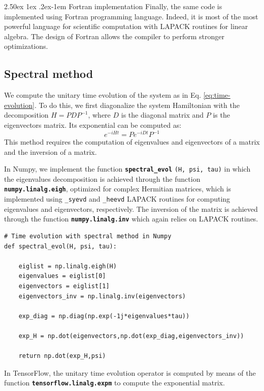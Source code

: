 \documentclass[rmp,10pt,onecolumn,fleqn,notitlepage]{revtex4-1}
\makeatletter
\renewcommand{\paragraph}{%
    \@startsection{paragraph}{4}%
    {\z@}{2.50ex \@plus 1ex \@minus .2ex}{-1em}%
    {\bf\sffamily}%
}
\makeatother
\begin{document}
\paragraph{Fortran implementation}
Finally, the same code is implemented using Fortran programming language. Indeed, it is most of the most powerful language for scientific computation with LAPACK routines for linear algebra. The design of Fortran allows the compiler to perform stronger optimizations. 


\subsection{Spectral method}
\label{subsec:spectral-method}
We compute the unitary time evolution of the system as in Eq. \eqref{eq:time-evolution}. To do this, we first diagonalize the system Hamiltonian with the decomposition $H = PDP^{-1}$, where $D$ is the diagonal matrix and $P$ is the eigenvectors matrix.
Its exponential can be computed as:
\begin{equation}
    e^{-iHt} = P e^{-iDt} P^{-1}
\end{equation}
This method requires the computation of eigenvalues and eigenvectors of a matrix and the inversion of a matrix.

In Numpy, we implement the function {\bfseries\texttt{spectral\_evol}} \texttt{(H, psi, tau)} in which the eigenvalues decomposition is achieved through the function {\bfseries\texttt{numpy.linalg.eigh}}, optimized for complex Hermitian matrices, which is implemented using \texttt{\_syevd} and \texttt{\_heevd} LAPACK routines for computing eigenvalues and eigenvectors, respectively. The inversion of the matrix is achieved through the function {\bfseries\texttt{numpy.linalg.inv}} which again relies on LAPACK routines. 

\begin{lstlisting}[style=myPython]
# Time evolution with spectral method in Numpy
def spectral_evol(H, psi, tau):

    eiglist = np.linalg.eigh(H)
    eigenvalues = eiglist[0]
    eigenvectors = eiglist[1]
    eigenvectors_inv = np.linalg.inv(eigenvectors)
    
    exp_diag = np.diag(np.exp(-1j*eigenvalues*tau))

    exp_H = np.dot(eigenvectors,np.dot(exp_diag,eigenvectors_inv))
    
    return np.dot(exp_H,psi)
\end{lstlisting}

In TensorFlow, the unitary time evolution operator is computed by means of the function {\bfseries\texttt{tensorflow.linalg.expm}} to compute the exponential matrix.
\end{document}
